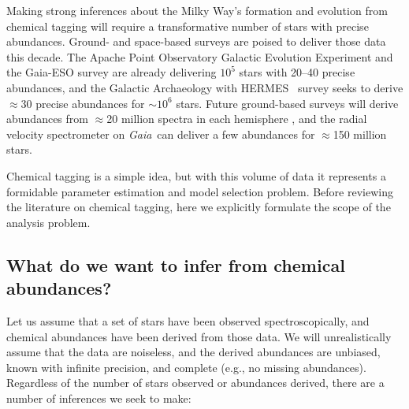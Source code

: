 \documentclass{aastex61}
\newcommand{\acronym}[1]{{\small{#1}}}
\newcommand{\project}[1]{\textsl{#1}}
\newcommand{\apogee}{\acronym{APOGEE}}
\newcommand{\ges}{\acronym{GES}}
\newcommand{\hermes}{\acronym{HERMES}}
\newcommand{\galah}{\acronym{GALAH}}
\newcommand{\fourmost}{\acronym{4MOST}}
\newcommand{\weave}{\acronym{WEAVE}}
\newcommand{\gaia}{\project{Gaia}}
\begin{document}



Making strong inferences about the Milky Way's formation and evolution from
chemical tagging will require a transformative number of stars with precise
abundances.
Ground- and space-based surveys are poised to deliver those data this decade. 
The Apache Point Observatory Galactic Evolution Experiment 
\citep[\apogee, e.g.,][]{apogee} and the Gaia-ESO survey 
\citep[\ges;][]{Gilmore_2012,Randich_2013} are already delivering $10^5$ stars 
with 20--40 precise abundances, and the Galactic Archaeology with \hermes\ 
\citep[\galah;][]{DeSilva_2015} survey seeks to derive $\approx$30 precise 
abundances for $\sim10^6$ stars. 
Future ground-based surveys will derive abundances from $\approx$20 million 
spectra in each hemisphere \citep[e.g., \weave, \fourmost;][]{weave,4most},
and the radial velocity spectrometer on \gaia\ can deliver a few abundances 
for $\approx$150 million stars.


Chemical tagging is a simple idea, but with this volume of data it represents
a formidable parameter estimation and model selection problem.
Before reviewing the literature on chemical tagging, here we explicitly
formulate the scope of the analysis problem.


\subsection{What do we want to infer from chemical abundances?}
\label{sec:the-problem}


Let us assume that a set of stars have been observed spectroscopically, and
chemical abundances have been derived from those data.
We will unrealistically assume that the data are noiseless, and the derived
abundances are unbiased, known with infinite precision, and complete (e.g., no 
missing abundances).
Regardless of the number of stars observed or abundances derived, there are a
number of inferences we seek to make:
\end{document}
